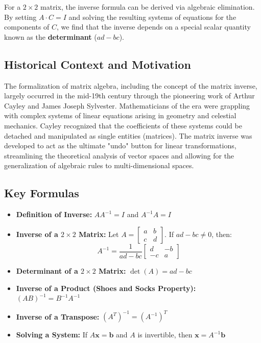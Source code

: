 \documentclass[11pt]{article}
\begin{document}
For a $2 \times 2$ matrix, the inverse formula can be derived via algebraic elimination. By setting $A \cdot C = I$ and solving the resulting systems of equations for the components of $C$, we find that the inverse depends on a special scalar quantity known as the \textbf{determinant} ($ad - bc$).

\subsection{Historical Context and Motivation}
The formalization of matrix algebra, including the concept of the matrix inverse, largely occurred in the mid-19th century through the pioneering work of Arthur Cayley and James Joseph Sylvester. Mathematicians of the era were grappling with complex systems of linear equations arising in geometry and celestial mechanics. Cayley recognized that the coefficients of these systems could be detached and manipulated as single entities (matrices). The matrix inverse was developed to act as the ultimate "undo" button for linear transformations, streamlining the theoretical analysis of vector spaces and allowing for the generalization of algebraic rules to multi-dimensional spaces.

\subsection{Key Formulas}
\begin{itemize}
    \item \textbf{Definition of Inverse:} $A A^{-1} = I$ and $A^{-1} A = I$
    \item \textbf{Inverse of a $2 \times 2$ Matrix:} Let $A = \begin{bmatrix} a & b \\ c & d \end{bmatrix}$. If $ad - bc \neq 0$, then:
    \[ A^{-1} = \frac{1}{ad - bc} \begin{bmatrix} d & -b \\ -c & a \end{bmatrix} \]
    \item \textbf{Determinant of a $2 \times 2$ Matrix:} $\det(A) = ad - bc$
    \item \textbf{Inverse of a Product (Shoes and Socks Property):} $(AB)^{-1} = B^{-1} A^{-1}$
    \item \textbf{Inverse of a Transpose:} $(A^T)^{-1} = (A^{-1})^T$
    \item \textbf{Solving a System:} If $A\mathbf{x} = \mathbf{b}$ and $A$ is invertible, then $\mathbf{x} = A^{-1}\mathbf{b}$
\end{itemize}
\end{document}
